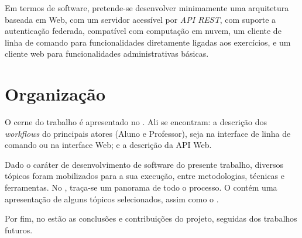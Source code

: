 Em termos de software, pretende-se desenvolver minimamente uma arquitetura baseada em Web,
com um servidor acessível por \emph{API REST}, com suporte a autenticação federada, 
compatível com computação em nuvem, um cliente de linha de comando para funcionalidades
diretamente ligadas aos exercícios, e um cliente web para
funcionalidades administrativas básicas.

\section{Organização}
O cerne do trabalho é apresentado no . Ali se encontram: a descrição
dos \emph{workflows} do principais atores (Aluno e Professor), seja na interface de linha de comando ou
na interface Web; e a descrição da API Web.

Dado o caráter de desenvolvimento de software do presente trabalho, diversos tópicos
foram mobilizados para a sua execução, entre metodologias, técnicas e ferramentas.
No , traça-se um panorama de todo o processo.
O  contém uma apresentação de alguns tópicos selecionados,
assim como o .

Por fim, no  estão as conclusões e contribuições do projeto, 
seguidas dos trabalhos futuros.